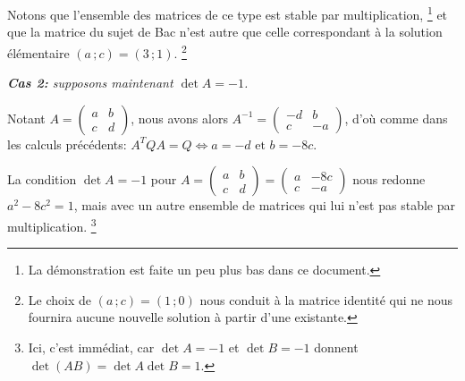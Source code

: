\medskip

Notons que l'ensemble des matrices de ce type est stable par multiplication,
\footnote{
    La démonstration est faite un peu plus bas dans ce document.
}
et que la matrice du sujet de Bac n'est autre que celle correspondant à la solution élémentaire
$(a \,; c) = (3 \,; 1)$.%
\footnote{
    Le choix de $(a \,; c) = (1 \,; 0)$ nous conduit à la matrice identité qui ne nous fournira aucune nouvelle solution à partir d'une existante.
}




\medskip

\textit{\textbf{Cas 2:} supposons maintenant $\det A = -1$.}

\medskip

Notant
$A = \begin{pmatrix}
  a & b \\
  c & d
\end{pmatrix}$,
nous avons alors
$A^{-1} = \begin{pmatrix}
  -d & b  \\
   c & -a
\end{pmatrix}$,
d'où comme dans les calculs précédents:
$A^T Q A = Q \Longleftrightarrow a = -d \text{ et } b = -8c$.


\medskip

La condition $\det A = -1$ pour
$A
=
\begin{pmatrix}
  a & b \\
  c & d
\end{pmatrix}
=
\begin{pmatrix}
  a & -8c \\
  c & -a
\end{pmatrix}$
nous redonne
$a^2 - 8c^2 = 1$,
mais avec un autre ensemble de matrices qui lui n'est pas stable par multiplication.%
\footnote{
    Ici, c'est immédiat, car $\det A = -1$ et $\det B = -1$ donnent 
    $\det(AB) = \det A \det B = 1$.
}
